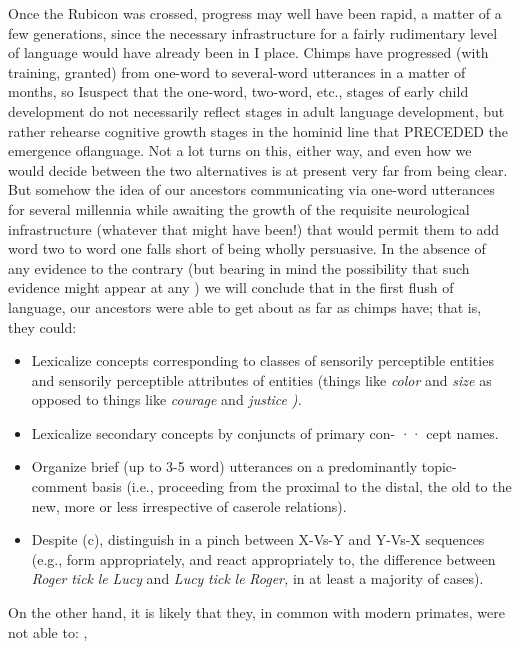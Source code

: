 Once the Rubicon was crossed, progress may well have been rapid, a matter of a few generations, since the necessary infrastructure for a fairly rudimentary level of language would have already been in
I
place. Chimps have progressed (with training, granted) from one-word to several-word utterances in a matter of months, so Isuspect that the one-word, two-word, etc., stages of early child development do not necessarily reflect stages in adult language development, but rather rehearse cognitive growth stages in the hominid line that PRECEDED
the emergence oflanguage. Not a lot turns on this, either way, and even how we would decide between the two alternatives is at present very far from being clear. But somehow the idea of our ancestors communi\-cating via one-word utterances for several millennia while awaiting the growth of the requisite neurological infrastructure (whatever that might
have been!) that would permit them to add word two to word one falls short of being wholly persuasive. In the absence of any evidence to the contrary (but bearing in mind the possibility that such evidence might appear at any ) we will conclude that in the first flush of language, our ancestors were able to get about as far as chimps have; that is, they could:


\begin{itemize}
\item Lexicalize concepts corresponding to classes of sensorily perceptible entities and sensorily perceptible attributes of entities (things like \textit{color} and \textit{size} as opposed to things like \textit{courage} and \textit{justice} \textit{).}
\item Lexicalize secondary concepts by conjuncts of primary con- ·· cept names.
\item Organize brief (up to 3-5 word) utterances on a predominantly topic-comment basis (i.e., proceeding from the proximal to the distal, the old to the new, more or less irrespective of case\-role relations).
\item Despite (c), distinguish in a pinch between X-Vs-Y and Y-Vs-X sequences (e.g., form appropriately, and react appropriately to, the difference between \textit{Roger} \textit{tick} \textit{le} \textit{Lucy} and \textit{Lucy} \textit{tick} \textit{le} \textit{Roger,} in at least a majority of cases).
\end{itemize}

On the other hand, it is likely that they, in common with modern primates, were not able to: ,

